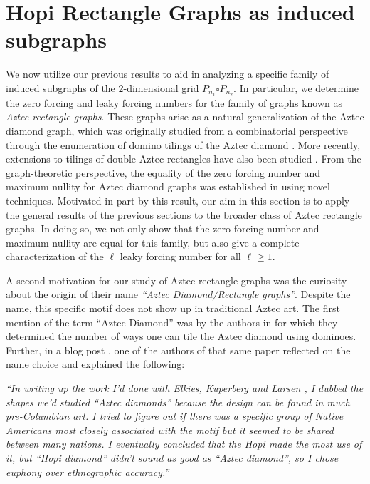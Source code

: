 \documentclass[11pt]{article}
\theoremstyle{plain} \newtheorem{question}{Question}
\theoremstyle{definition}
\begin{document}
\section{Hopi Rectangle Graphs as induced subgraphs}\label{sec:ApplicationHopiRec}
We now utilize our previous results to aid in analyzing a specific family of induced subgraphs of the $2$-dimensional grid $P_{n_1}\square P_{n_2}$. In particular, we determine the zero forcing and leaky forcing numbers for the family of graphs
known as \emph{Aztec rectangle graphs}. These graphs arise as a natural generalization of the Aztec diamond graph, which was originally studied from a combinatorial perspective through the enumeration of domino tilings of the Aztec diamond \cite{FirstMentionAD,AztecDiamondGraphs-Benkart}. More recently, extensions to tilings of double Aztec rectangles have also been studied \cite{DoubleAztecRect}. From the graph-theoretic perspective, the equality of the zero forcing number and maximum nullity for Aztec diamond graphs was established in \cite{TechniquesLowerBoundZF} using
novel techniques. Motivated in part by this result, our aim in this section is to apply the general results of the previous
sections to the broader class of Aztec rectangle graphs. In doing so, we not only show that the zero forcing number and maximum nullity are equal for this family, but also give a complete characterization of the $\ell$ leaky forcing number for all $\ell\ge 1$.


A second motivation for our study of Aztec rectangle graphs was the curiosity about the origin of their name \textit{``Aztec Diamond/Rectangle graphs''}. Despite the name, this specific motif does not show up in traditional Aztec art. The first mention of the term ``Aztec Diamond'' was by the authors in \cite{FirstMentionAD} for which they determined the number of ways one can tile the Aztec diamond using dominoes. Further, in a blog post \cite{ProppBlog}, one of the authors of that same paper reflected on the name choice and explained the following: 

\begin{center}
\textit{
``In writing up the work I’d done with Elkies, Kuperberg and Larsen \cite{FirstMentionAD}, I dubbed the shapes we’d studied “Aztec diamonds” because the design can be found in much pre-Columbian art.  I tried to figure out if there was a specific group of Native Americans most closely associated with the motif but it seemed to be shared between many nations. I eventually concluded that the Hopi made the most use of it, but “Hopi diamond” didn’t sound as good as “Aztec diamond”, so I chose euphony over ethnographic accuracy.''}\end{center}
\end{document}
